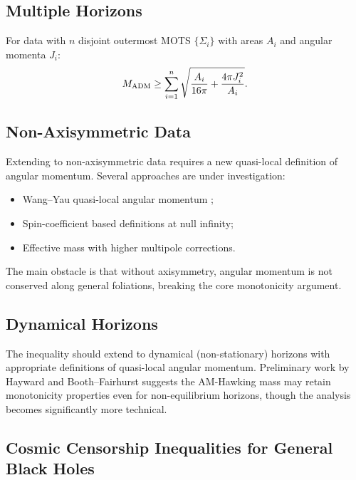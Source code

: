 \subsection{Multiple Horizons}

\begin{conjecture}
For data with $n$ disjoint outermost MOTS $\{\Sigma_i\}$ with areas $A_i$ and angular momenta $J_i$:
\begin{equation}
M_{\mathrm{ADM}} \geq \sum_{i=1}^n \sqrt{\frac{A_i}{16\pi} + \frac{4\pi J_i^2}{A_i}}.
\end{equation}
\end{conjecture}

\subsection{Non-Axisymmetric Data}

Extending to non-axisymmetric data requires a new quasi-local definition of angular momentum. Several approaches are under investigation:
\begin{itemize}
    \item Wang--Yau quasi-local angular momentum \cite{wangyau2009};
    \item Spin-coefficient based definitions at null infinity;
    \item Effective mass with higher multipole corrections.
\end{itemize}
The main obstacle is that without axisymmetry, angular momentum is not conserved along general foliations, breaking the core monotonicity argument.

\subsection{Dynamical Horizons}

The inequality should extend to dynamical (non-stationary) horizons with appropriate definitions of quasi-local angular momentum. Preliminary work by Hayward and Booth--Fairhurst suggests the AM-Hawking mass may retain monotonicity properties even for non-equilibrium horizons, though the analysis becomes significantly more technical.

\subsection{Cosmic Censorship Inequalities for General Black Holes}\label{subsec:cosmic-censorship-ineq}

